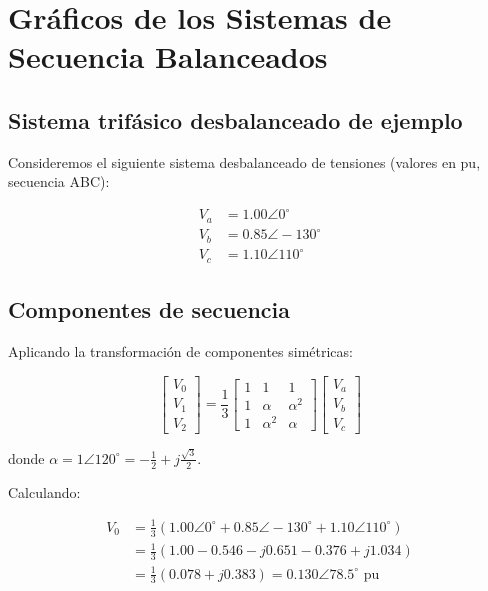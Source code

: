 \documentclass[12pt,a4paper]{article}
\begin{document}
\newpage
\section{Gráficos de los Sistemas de Secuencia Balanceados}

\subsection{Sistema trifásico desbalanceado de ejemplo}

Consideremos el siguiente sistema desbalanceado de tensiones (valores en pu, secuencia ABC):

\[
\begin{aligned}
V_a &= 1.00\angle 0^\circ \\
V_b &= 0.85\angle -130^\circ \\
V_c &= 1.10\angle 110^\circ
\end{aligned}
\]

\subsection{Componentes de secuencia}

Aplicando la transformación de componentes simétricas:

\[
\begin{bmatrix}
V_0 \\ V_1 \\ V_2
\end{bmatrix}
= \frac{1}{3}
\begin{bmatrix}
1 & 1 & 1 \\
1 & \alpha & \alpha^2 \\
1 & \alpha^2 & \alpha
\end{bmatrix}
\begin{bmatrix}
V_a \\ V_b \\ V_c
\end{bmatrix}
\]

donde $\alpha = 1\angle120^\circ = -\frac12 + j\frac{\sqrt{3}}{2}$.

Calculando:

\[
\begin{aligned}
V_0 &= \frac13(1.00\angle0^\circ + 0.85\angle-130^\circ + 1.10\angle110^\circ) \\
    &= \frac13(1.00 - 0.546 - j0.651 - 0.376 + j1.034) \\
    &= \frac13(0.078 + j0.383) = 0.130\angle78.5^\circ\text{ pu}
\end{aligned}
\]
\end{document}
